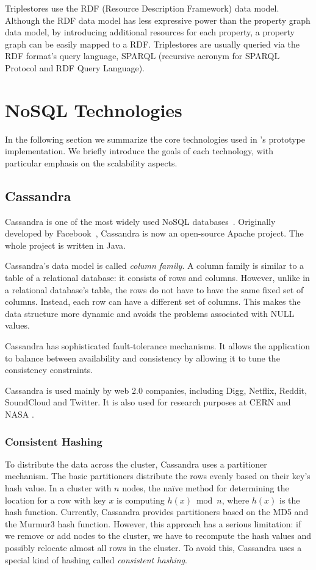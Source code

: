 Triplestores use the RDF (Resource Description Framework) data model. Although the RDF data model has less expressive power than the property graph data model, by introducing additional resources for each property, a property graph can be easily mapped to a RDF. Triplestores are usually queried via the RDF format's query language, SPARQL (recursive acronym for SPARQL Protocol and RDF Query Language). 

\section{NoSQL Technologies}

In the following section we summarize the core technologies used in \iqd's prototype implementation. We briefly introduce the goals of each technology, with particular emphasis on the scalability aspects.
 
\subsection{Cassandra}

Cassandra is one of the most widely used NoSQL databases~\cite{Cassandra}. Originally developed by Facebook~\cite{Lakshman:2010:CDS:1773912.1773922}, Cassandra is now an open-source Apache project. The whole project is written in Java.

Cassandra's data model is called \emph{column family}. A column family is similar to a table of a relational database: it consists of rows and columns. However, unlike in a relational database's table, the rows do not have to have the same fixed set of columns. Instead, each row can have a different set of columns. This makes the data structure more dynamic and avoids the problems associated with NULL values.

Cassandra has sophisticated fault-tolerance mechanisms. It allows the application to balance between availability and consistency by allowing it to tune the consistency constraints.

Cassandra is used mainly by web 2.0 companies, including Digg, Netflix, Reddit, SoundCloud and Twitter. It is also used for research purposes at CERN and NASA \cite{CassandraCompanies}.

\subsubsection{Consistent Hashing}

To distribute the data across the cluster, Cassandra uses a partitioner mechanism. The basic partitioners distribute the rows evenly based on their key's hash value. In a cluster with $n$ nodes, the na\"ive method for determining the location for a row with key $x$ is computing $ h(x) \bmod n $, where $h(x)$ is the hash function. Currently, Cassandra provides partitioners based on the MD5 and the Murmur3 hash function. However, this approach has a serious limitation: if we remove or add nodes to the cluster, we have to recompute the hash values and possibly relocate almost all rows in the cluster. To avoid this, Cassandra uses a special kind of hashing called \textit{consistent hashing}.

